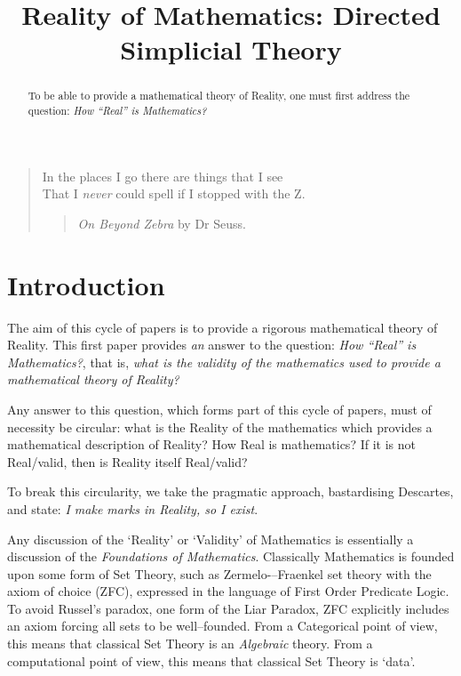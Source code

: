\documentclass[a4paper,openany]{amsbook}
\begin{document}
\frontmatter
\sloppy

\title[DiSimplicial Theory]{Reality of Mathematics: Directed Simplicial Theory}

%

\begin{abstract}
To be able to provide a mathematical theory of Reality, one must first 
address the question: \textit{How ``Real'' is Mathematics?}
\end{abstract} 
\maketitle 
\tableofcontents 
\mainmatter

\begin{quotation}
In the places I go there are things that I see\\
That I \emph{never} could spell if I stopped with the Z.\\
\begin{quote}
\textit{On Beyond Zebra} by Dr Seuss.
\end{quote}
\end{quotation}

\section{Introduction}

The aim of this cycle of papers is to provide a rigorous mathematical theory of
Reality. This first paper provides \emph{an} answer to the question: \emph{How
``Real'' is Mathematics?}, that is, \emph{what is the validity of the
mathematics used to provide a mathematical theory of Reality?}

Any answer to this question, which forms part of this cycle of papers, must of
necessity be circular: what is the Reality of the mathematics which provides a
mathematical description of Reality? How Real is mathematics? If it is not
Real/valid, then is Reality itself Real/valid?

To break this circularity, we take the pragmatic approach, bastardising
Descartes, and state: \emph{I make marks in Reality, so I exist}.

Any discussion of the `Reality' or `Validity' of Mathematics is essentially a
discussion of the \textit{Foundations of Mathematics}. Classically Mathematics
is founded upon some form of Set Theory, such as Zermelo-–Fraenkel set theory
with the axiom of choice (ZFC), expressed in the language of First Order
Predicate Logic. To avoid Russel's paradox, one form of the Liar Paradox, ZFC
explicitly includes an axiom forcing all sets to be well--founded. From a
Categorical point of view, this means that classical Set Theory is an
\emph{Algebraic} theory. From a computational point of view, this means that
classical Set Theory is `data'.
\end{document}
